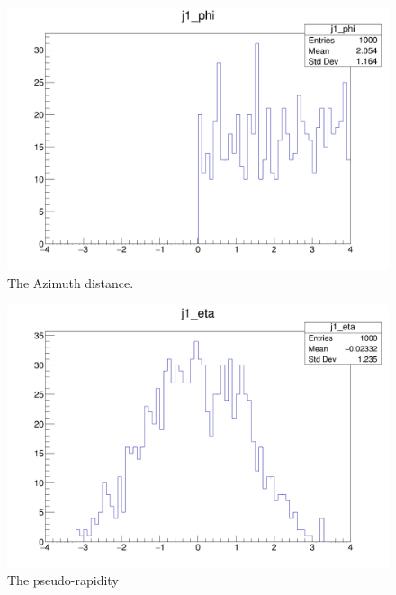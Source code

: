 \begin{figure}[hbtp]
\centering
\includegraphics[scale=.4]{images/phi.png}
\caption{The Azimuth distance.  }
\end{figure}

\begin{figure}[hbtp]
\centering
\includegraphics[scale=.3]{images/eta.png}
\caption{The pseudo-rapidity}
\end{figure}

      